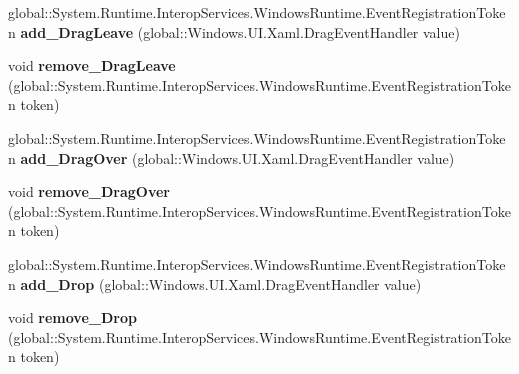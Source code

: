 \begin{DoxyCompactItemize}
\item 
\mbox{\label{interface_windows_1_1_u_i_1_1_xaml_1_1_i_u_i_element_ad7eb2baf580fcb2515afa4af987599d4}} 
global\+::\+System.\+Runtime.\+Interop\+Services.\+Windows\+Runtime.\+Event\+Registration\+Token {\bfseries add\+\_\+\+Drag\+Leave} (global\+::\+Windows.\+U\+I.\+Xaml.\+Drag\+Event\+Handler value)
\item 
\mbox{\label{interface_windows_1_1_u_i_1_1_xaml_1_1_i_u_i_element_ad457a93ec08cee7b4f4b038673af7df0}} 
void {\bfseries remove\+\_\+\+Drag\+Leave} (global\+::\+System.\+Runtime.\+Interop\+Services.\+Windows\+Runtime.\+Event\+Registration\+Token token)
\item 
\mbox{\label{interface_windows_1_1_u_i_1_1_xaml_1_1_i_u_i_element_a6deb1e61adbba0617ff0428e75ee83da}} 
global\+::\+System.\+Runtime.\+Interop\+Services.\+Windows\+Runtime.\+Event\+Registration\+Token {\bfseries add\+\_\+\+Drag\+Over} (global\+::\+Windows.\+U\+I.\+Xaml.\+Drag\+Event\+Handler value)
\item 
\mbox{\label{interface_windows_1_1_u_i_1_1_xaml_1_1_i_u_i_element_a3fe57bf41ebbf92eca2afbd6cf17c63f}} 
void {\bfseries remove\+\_\+\+Drag\+Over} (global\+::\+System.\+Runtime.\+Interop\+Services.\+Windows\+Runtime.\+Event\+Registration\+Token token)
\item 
\mbox{\label{interface_windows_1_1_u_i_1_1_xaml_1_1_i_u_i_element_a1aa925e3d35192dcae38b8299243b5f4}} 
global\+::\+System.\+Runtime.\+Interop\+Services.\+Windows\+Runtime.\+Event\+Registration\+Token {\bfseries add\+\_\+\+Drop} (global\+::\+Windows.\+U\+I.\+Xaml.\+Drag\+Event\+Handler value)
\item 
\mbox{\label{interface_windows_1_1_u_i_1_1_xaml_1_1_i_u_i_element_a8138853a5ec389ca042bd806a4488df2}} 
void {\bfseries remove\+\_\+\+Drop} (global\+::\+System.\+Runtime.\+Interop\+Services.\+Windows\+Runtime.\+Event\+Registration\+Token token)
\item 
\mbox{\label{interface_windows_1_1_u_i_1_1_xaml_1_1_i_u_i_element_ac6c56c4e4d441548d94d567610440f7a}} 

\end{DoxyCompactItemize}
